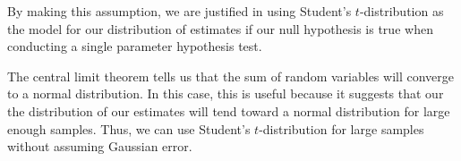 \documentclass[12pt,twoside]{article}
\begin{document}
\begin{problems}
\begin{problemparts}

\problempart %

By making this assumption, we are justified in using Student's $t$-distribution
as the model for our distribution of estimates if our null hypothesis is true
when conducting a single parameter hypothesis test.

\problempart %

The central limit theorem tells us that the sum of random variables will 
converge to a normal distribution. In this case, this is useful because it
suggests that our the distribution of our estimates will tend toward a normal
distribution for large enough samples. Thus, we can use Student's 
$t$-distribution for large samples without assuming Gaussian error.

\end{problemparts}

\newpage

\problem  %

\begin{problemparts}

\problempart %


\end{problemparts}
\end{problems}
\end{document}
